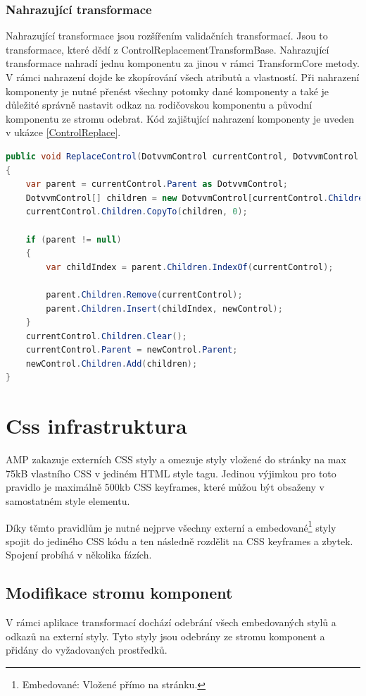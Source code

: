 \subsubsection{Nahrazující transformace}
    Nahrazující transformace jsou rozšířením validačních transformací. Jsou to transformace, které dědí z ControlReplacementTransformBase. Nahrazující transformace nahradí jednu komponentu za jinou v rámci TransformCore metody. V rámci nahrazení dojde ke zkopírování všech atributů a vlastností. Při nahrazení komponenty je nutné přenést všechny potomky dané komponenty a také je důležité správně nastavit odkaz na rodičovskou komponentu a původní komponentu ze stromu odebrat. Kód zajištující nahrazení komponenty je uveden v ukázce \ref{ControlReplace}.
    
    \begin{lstlisting}[language=c#, caption= Nahrazení jedné DotVVM komponenty za jinou. ,label=ControlReplace,captionpos=t]
public void ReplaceControl(DotvvmControl currentControl, DotvvmControl newControl)
{
    var parent = currentControl.Parent as DotvvmControl;
    DotvvmControl[] children = new DotvvmControl[currentControl.Children.Count];
    currentControl.Children.CopyTo(children, 0);

    if (parent != null)
    {
        var childIndex = parent.Children.IndexOf(currentControl);

        parent.Children.Remove(currentControl);
        parent.Children.Insert(childIndex, newControl);
    }
    currentControl.Children.Clear();
    currentControl.Parent = newControl.Parent;
    newControl.Children.Add(children);
}

\end{lstlisting}

\section{Css infrastruktura}
AMP zakazuje externích CSS styly a omezuje styly vložené do stránky na max 75kB vlastního CSS v jediném HTML style tagu. Jedinou výjimkou pro toto pravidlo je maximálně 500kb CSS keyframes, které můžou být obsaženy v samostatném style elementu.

Díky těmto pravidlům je nutné nejprve všechny externí a embedované\footnote{Embedované: Vložené přímo na stránku.} styly spojit do jediného CSS kódu a ten následně rozdělit na CSS keyframes a zbytek. Spojení probíhá v několika fázích.
\subsection*{Modifikace stromu komponent}
V rámci aplikace transformací dochází odebrání všech embedovaných stylů a odkazů na externí styly. Tyto styly jsou odebrány ze stromu komponent a přidány do vyžadovaných prostředků.


